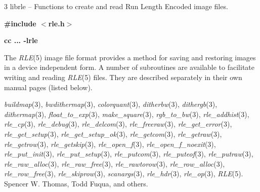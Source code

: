 %
%
%
 3
librle -- Functions to create and read Run Length Encoded image files.

\bf
\#include $<$rle.h$>$
\par\vspace{1.0\baselineskip}
\bf
cc ... -lrle

The
{\it RLE}{\rm (5)}
image file format provides a method for saving and restoring images in
a device independent form.  A number of subroutines are available to
facilitate writing and reading 
{\it RLE}{\rm (5)}
files.  They are described separately in their own manual pages
(listed below).
\raggedright
{\it buildmap}{\rm (3),}
{\it bwdithermap}{\rm (3),}
{\it colorquant}{\rm (3),}
{\it ditherbw}{\rm (3),}
{\it dithergb}{\rm (3),}
{\it dithermap}{\rm (3),}
{\it float\_to\_exp}{\rm (3),}
{\it make\_square}{\rm (3),}
{\it rgb\_to\_bw}{\rm (3),}
{\it rle\_addhist}{\rm (3),}
{\it rle\_cp}{\rm (3),}
{\it rle\_debug}{\rm (3),}
{\it rle\_delcom}{\rm (3),}
{\it rle\_freeraw}{\rm (3),}
{\it rle\_get\_error}{\rm (3),}
{\it rle\_get\_setup}{\rm (3),}
{\it rle\_get\_setup\_ok}{\rm (3),}
{\it rle\_getcom}{\rm (3),}
{\it rle\_getraw}{\rm (3),}
{\it rle\_getrow}{\rm (3),}
{\it rle\_getskip}{\rm (3),}
{\it rle\_open\_f}{\rm (3),}
{\it rle\_open\_f\_noexit}{\rm (3),}
{\it rle\_put\_init}{\rm (3),}
{\it rle\_put\_setup}{\rm (3),}
{\it rle\_putcom}{\rm (3),}
{\it rle\_puteof}{\rm (3),}
{\it rle\_putraw}{\rm (3),}
{\it rle\_raw\_alloc}{\rm (3),}
{\it rle\_raw\_free}{\rm (3),}
{\it rle\_rawtorow}{\rm (3),}
{\it rle\_row\_alloc}{\rm (3),}
{\it rle\_row\_free}{\rm (3),}
{\it rle\_skiprow}{\rm (3),}
{\it scanargs}{\rm (3),}
{\it rle\_hdr}{\rm (3),}
{\it rle\_op}{\rm (3),}
{\it RLE}{\rm (5).}
Spencer W. Thomas, Todd Fuqua, and others.

\newpage


